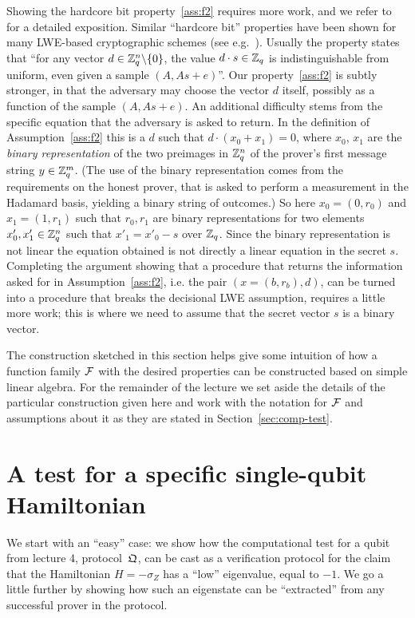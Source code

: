Showing the hardcore bit property~\ref{ass:f2} requires more work, and we refer to~\cite{brakerski2018cryptographic} for a detailed exposition. Similar ``hardcore bit'' properties have been shown for many LWE-based cryptographic schemes (see e.g.~\cite{akavia2009simultaneous}). Usually the property states that ``for any vector $d\in\mathbb{Z}_q^n\backslash\{0\}$, the value $d\cdot s\in\mathbb{Z}_q$ is indistinguishable from uniform, even given a sample $(A,As+e)$''. Our property~\ref{ass:f2} is subtly stronger, in that the adversary may choose the vector $d$ itself, possibly as a function of the sample $(A,As+e)$. An additional difficulty stems from the specific equation that the adversary is asked to return. In the definition of Assumption~\ref{ass:f2} this is a $d$ such that $d\cdot (x_0+x_1)=0$, where $x_0$, $x_1$ are the \emph{binary representation} of the two preimages in $\mathbb{Z}_q^n$ of the prover's first message string $y\in \mathbb{Z}_q^m$. (The use of the binary representation comes from the requirements on the honest prover, that is asked to perform a measurement in the Hadamard basis, yielding a binary string of outcomes.) So here $x_0=(0,r_0)$ and $x_1=(1,r_1)$ such that $r_0,r_1$ are binary representations for two elements $x'_0,x'_1\in \mathbb{Z}_q^n$ such that $x'_1=x'_0-s$ over $\mathbb{Z}_q$. Since the binary representation is not linear the equation obtained is not directly a linear equation in the secret $s$. Completing  the argument showing that a procedure that returns the information asked for in Assumption~\ref{ass:f2}, i.e. the pair $(x=(b,r_b),d)$, can be turned into a procedure that breaks the decisional LWE assumption, requires a little more work; this is where we need to assume that the secret vector $s$ is a binary vector. 


The construction sketched in this section helps give some intuition of how a function family $\mathcal{F}$ with the desired properties can be constructed based on simple linear algebra. 
For the remainder of the lecture we set aside the details of the particular construction given here and work with the notation for $\mathcal{F}$ and assumptions about it as they are stated in Section~\ref{sec:comp-test}.


\section{A test for a specific single-qubit Hamiltonian}

We start with an ``easy'' case: we show how the computational test for a qubit from lecture 4, protocol~$\mathfrak{Q}$, can be cast as a verification protocol for the claim that the Hamiltonian $H=-\sigma_Z$ has a ``low'' eigenvalue, equal to $-1$. We go a little further by showing how such an eigenstate can be ``extracted'' from any successful prover in the protocol. 

